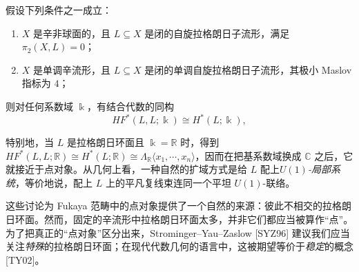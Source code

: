 
\begin{theorem*}[{Floer'89 [Flo89]、Oh'96 [Oh96] 等}]
假设下列条件之一成立：
\begin{enumerate}[label=\roman*.,leftmargin=1.9em,itemsep=1pt,topsep=2pt]
  \item $X$ 是辛非球面的，且 $L\subseteq X$ 是闭的自旋拉格朗日子流形，满足 $\pi_2(X,L)=0$；
  \item $X$ 是单调辛流形，且 $L\subseteq X$ 是闭的单调自旋拉格朗日子流形，其极小 Maslov 指标为 $4$；
\end{enumerate}
则对任何系数域 $\Bbbk$，有结合代数的同构
\[
  HF^{\ast}(L,L;\Bbbk)\cong H^{\ast}(L;\Bbbk),
\]
\end{theorem*}



特别地，当 $L$ 是拉格朗日环面且 $\Bbbk=\mathbb{R}$ 时，得到 $HF^{\ast}(L,L;\mathbb{R})\cong H^{\ast}(L;\mathbb{R})\cong\Lambda_{\mathbb{R}}\langle x_1,\dotsb,x_n\rangle$，因而在把基系数域换成 $\mathbb{C}$ 之后，它就接近于点对象。从几何上看，一种自然的扩域方式是给 $L$ 配上\emph{$U(1)$-局部系统}，等价地说，配上 $L$ 上的平凡复线束连同一个平坦 $U(1)$-联络。


这些讨论为 Fukaya 范畴中的点对象提供了一个自然的来源：彼此不相交的拉格朗日环面。然而，固定的辛流形中拉格朗日环面太多，并非它们都应当被算作“点”。为了把真正的“点对象”区分出来，Strominger--Yau--Zaslow [SYZ96] 建议我们应当关注\emph{特殊}的拉格朗日环面；在现代代数几何的语言中，这被期望等价于\emph{稳定}的概念 [TY02]。

